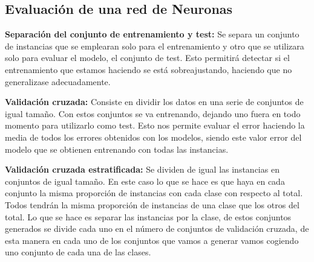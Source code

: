 \documentclass[12pt, twoside, openright]{report} %
\begin{document}
\subsection{Evaluación de una red de Neuronas}
\textbf{Separación del conjunto de entrenamiento y test:} Se separa un conjunto de instancias que se emplearan solo para el entrenamiento y otro que se utilizara solo para evaluar el modelo, el conjunto de test. Esto permitirá detectar si el entrenamiento que estamos haciendo se está sobreajustando, haciendo que no generalizase adecuadamente.
\pagebreak

\textbf{Validación cruzada:} Consiste en dividir los datos en una serie de conjuntos de igual tamaño. Con estos conjuntos se va entrenando, dejando uno fuera en todo momento para utilizarlo como test. Esto nos permite evaluar el error haciendo la media de todos los errores obtenidos con los modelos, siendo este valor error del modelo que se obtienen entrenando con todas las instancias.

\textbf{Validación cruzada estratificada:} Se dividen de igual las instancias en conjuntos de igual tamaño. En este caso lo que se hace es que haya en cada conjunto la misma proporción de instancias con cada clase con respecto al total. Todos tendrán la misma proporción de instancias de una clase que los otros del total.
Lo que se hace es separar las instancias por la clase, de estos conjuntos generados se divide cada uno en el número de conjuntos de validación cruzada, de esta manera en cada uno de los conjuntos que vamos a generar vamos cogiendo uno conjunto de cada una de las clases.
\end{document}
